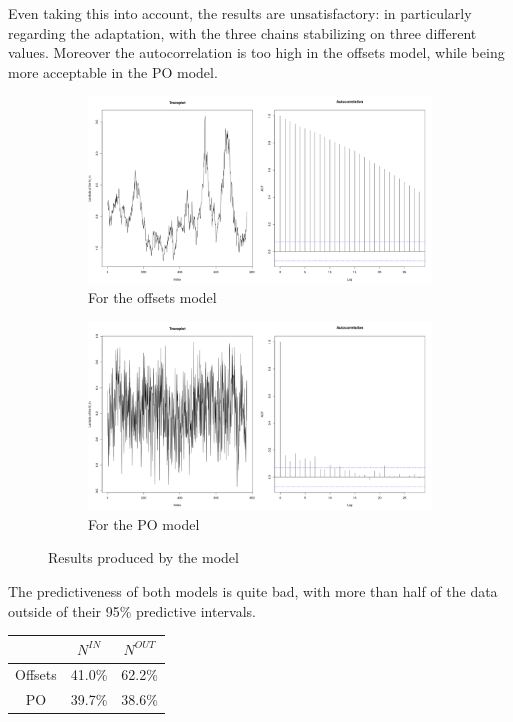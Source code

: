 \documentclass[11pt,twoside]{report}
\begin{document}

Even taking this into account, the results are unsatisfactory: in particularly regarding the adaptation, with the three chains stabilizing on three different values. Moreover the autocorrelation is too high in the offsets model, while being more acceptable in the PO model. \\

\begin{figure}[H]
	\begin{subfigure}[H]{.5\linewidth}
		\centering
		\includegraphics[width=70 mm]{pictures/posterior_off.png}
		\caption{For the offsets model}
		\label{fig:post_off}
	\end{subfigure}
	\hfill
	\begin{subfigure}[H]{.5\linewidth}
		\centering
		\includegraphics[width=70 mm]{pictures/posterior_nbn.png}
		\caption{For the PO model}
		\label{fig:post_nbn}
	\end{subfigure}%
	\caption{Results produced by the model}
\end{figure}


The predictiveness of both models is quite bad, with more than half of the data outside of their 95\% predictive intervals.

\begin{center}
	\begin{tabular}{ |c|c|c| } 
		\hline
		& $N^{IN}$ & $N^{OUT}$ \\ 
		\hline
		Offsets & 41.0\% & 62.2\% \\ 
		PO & 39.7\% & 38.6\% \\ 
		\hline
	\end{tabular}
\end{center}
\end{document}
